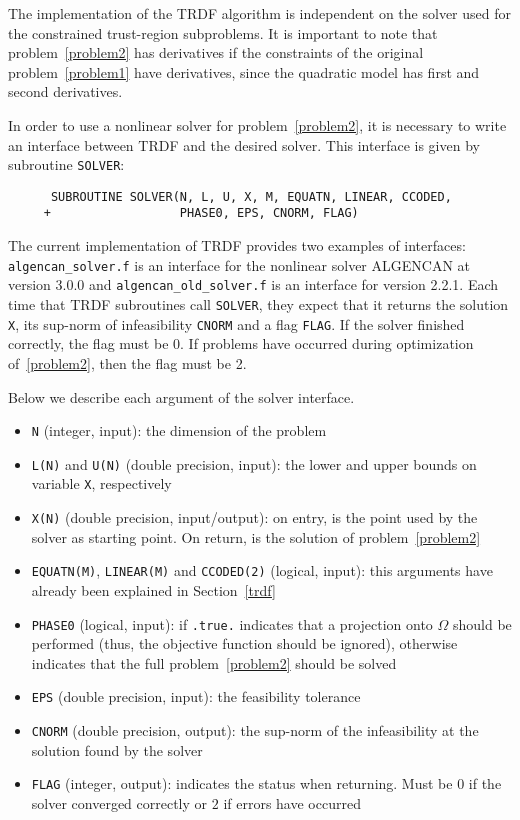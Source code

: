 \documentclass[12pt]{article}
\begin{document}
The implementation of the TRDF algorithm is independent on the solver
used for the constrained trust-region subproblems. It is important to
note that problem~\eqref{problem2} has derivatives if the constraints
of the original problem~\eqref{problem1} have derivatives, since the
quadratic model has first and second derivatives.

In order to use a nonlinear solver for problem~\eqref{problem2}, it
is necessary to write an interface between TRDF and the desired
solver. This interface is given by subroutine \texttt{SOLVER}:

\begin{verbatim}
      SUBROUTINE SOLVER(N, L, U, X, M, EQUATN, LINEAR, CCODED,
     +                  PHASE0, EPS, CNORM, FLAG)
\end{verbatim}

The current implementation of TRDF provides two examples of
interfaces:\\ \texttt{algencan\_solver.f} is an interface for the
nonlinear solver ALGENCAN at version 3.0.0 and
\texttt{algencan\_old\_solver.f} is an interface for version 2.2.1. Each
time that TRDF subroutines call \texttt{SOLVER}, they expect that it
returns the solution \texttt{X}, its sup-norm of infeasibility
\texttt{CNORM} and a flag \texttt{FLAG}. If the solver finished
correctly, the flag must be 0. If problems have occurred during
optimization of~\eqref{problem2}, then the flag must be 2.

Below we describe each argument of the solver interface.

\begin{itemize}
\item \texttt{N} (integer, input): the dimension of the problem
\item \texttt{L(N)} and \texttt{U(N)} (double precision, input): the
  lower and upper bounds on variable \texttt{X}, respectively
\item \texttt{X(N)} (double precision, input/output): on entry, is the
  point used by the solver as starting point. On return, is the
  solution of problem~\eqref{problem2}
\item \texttt{EQUATN(M)}, \texttt{LINEAR(M)} and \texttt{CCODED(2)}
  (logical, input): this arguments have already been explained in
  Section~\ref{trdf}
\item \texttt{PHASE0} (logical, input): if \texttt{.true.} indicates
  that a projection onto $\Omega$ should be performed (thus, the
  objective function should be ignored), otherwise indicates that the
  full problem~\eqref{problem2} should be solved
\item \texttt{EPS} (double precision, input): the feasibility
  tolerance
\item \texttt{CNORM} (double precision, output): the sup-norm of the
  infeasibility at the solution found by the solver
\item \texttt{FLAG} (integer, output): indicates the status when
  returning. Must be $0$ if the solver converged correctly or $2$ if
  errors have occurred
\end{itemize}
\end{document}
